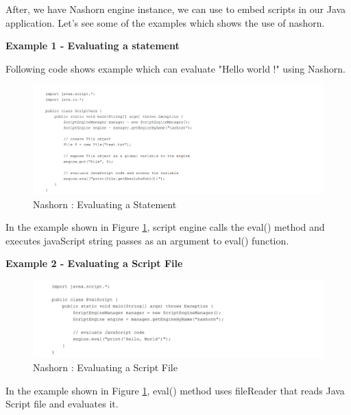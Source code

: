 After, we have Nashorn engine instance, we can use to embed scripts in our Java application. Let's see some of the examples which shows the use of nashorn.

\textbf{Example 1 - Evaluating a statement}


Following code shows example which can evaluate "Hello world !" using Nashorn.

\begin{figure}[ht]
	\begin{center}
		\includegraphics[width=\linewidth]{./images/nashornexposingJavaObject.png}
	\end{center}
	\caption{Nashorn : Evaluating a Statement}
	\label{fig:nashornexposingjavaobject}
\end{figure}


In the example shown in Figure \ref{fig:nashornexposingjavaobject}, script engine calls the eval() method and executes javaScript string passes as an argument to eval() function. 


\textbf{Example 2 - Evaluating a Script File}



\begin{figure}[ht]
	\begin{center}
		\includegraphics[width=\linewidth]{./images/nashornPrintHello.png}
	\end{center}
	\caption{Nashorn : Evaluating a Script File}
	\label{fig:nashornPrintHello}
\end{figure}

In the example shown in Figure \ref{fig:nashornexposingjavaobject}, eval() method uses fileReader that reads Java Script file and evaluates it.


